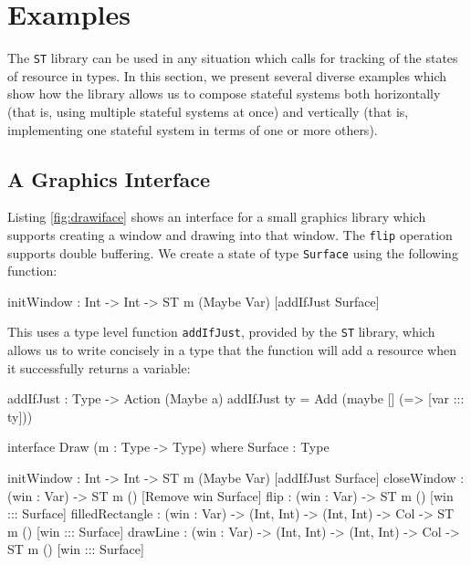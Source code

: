 \section{Examples}

\label{sect:examples}


The \texttt{ST} library can be used in any situation which calls for tracking
of the states of resource in types. In this section, we present several
diverse examples which
show how the library allows us to compose stateful systems both
horizontally (that is, using multiple stateful systems at once) and
vertically (that is, implementing one stateful system in terms of one or
more others). 

\subsection{A Graphics Interface}

Listing \ref{fig:drawiface} shows an interface for a small graphics library
which supports creating a window and drawing into that window.
The \texttt{flip} operation supports double buffering.
We create a state of type \texttt{Surface} using the following function:

\small
\begin{code}
initWindow : Int -> Int -> ST m (Maybe Var) [addIfJust Surface]
\end{code}
\normalsize

This uses a type level function \texttt{addIfJust}, provided by the \texttt{ST}
library, which allows us to write concisely in a type that the function will
add a resource when it successfully returns a variable:

\small
\begin{code}
addIfJust : Type -> Action (Maybe a)
addIfJust ty = Add (maybe [] (\var => [var ::: ty]))
\end{code}
\normalsize

\small
\begin{code}[float=h, frame=single,caption={The \texttt{Draw} interface which
supports drawing lines in a window},label=fig:drawiface]
interface Draw (m : Type -> Type) where
  Surface : Type

  initWindow : Int -> Int -> ST m (Maybe Var) [addIfJust Surface]
  closeWindow : (win : Var) -> ST m () [Remove win Surface] 
  flip : (win : Var) -> ST m () [win ::: Surface]
  filledRectangle : (win : Var) -> (Int, Int) -> (Int, Int) -> Col ->
                    ST m () [win ::: Surface]
  drawLine : (win : Var) -> (Int, Int) -> (Int, Int) -> Col ->
             ST m () [win ::: Surface]
\end{code}
\normalsize

